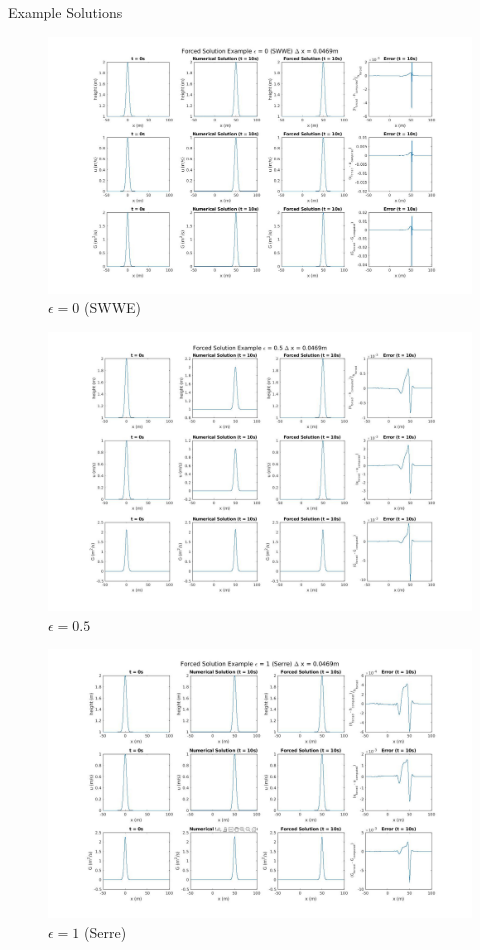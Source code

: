 \documentclass[10pt]{article}
\begin{document}
	Example Solutions

	\begin{figure}[h!]
		\includegraphics[width=23.0cm]{ExampleEps0.jpg}
		\caption{$\epsilon = 0$ (SWWE)}
	\end{figure}

	\begin{figure}[h!]
	\includegraphics[width=23.0cm]{ExampleEps0p5.jpg}
	\caption{$\epsilon = 0.5$ }
	\end{figure}

	\begin{figure}[h!]
	\includegraphics[width=23.0cm]{ExampleEps1.jpg}
	\caption{$\epsilon = 1$ (Serre)}
	\end{figure}
	
\end{document}
